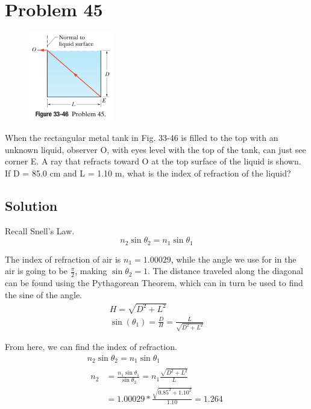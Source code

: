 \documentclass[12pt]{article}
\begin{document}
    \section{Problem 45}
        \begin{figure}
            \vspace{-30pt}
            \includegraphics[width=0.33\textwidth]{33-46.png} 
        \end{figure}
        When the rectangular metal tank in Fig. 33-46 is filled to the top with an unknown liquid, observer O, with eyes level with the top of the tank, can just see corner E. 
        A ray that refracts toward O at the top surface of the liquid is shown. 
        If D = 85.0 cm and L = 1.10 m, what is the index of refraction of the liquid?

        \subsection{Solution}
            Recall Snell's Law.
            \begin{equation}
                n_2 \sin \theta_2 = n_1 \sin \theta_1
            \end{equation}

            The index of refraction of air is $n_1 = 1.00029$, while the angle we use for in the air is going to be $\frac{\pi}{2}$, making $\sin \theta_2 = 1$.
            The distance traveled along the diagonal can be found using the Pythagorean Theorem, which can in turn be used to find the sine of the angle.
            \begin{gather}
                H = \sqrt{D^2 + L^2}\\
                \sin(\theta_1) = \frac{D}{H} = \frac{L}{\sqrt{D^2 + L^2}}
            \end{gather}

            From here, we can find the index of refraction.
            \begin{gather}
                n_2 \sin \theta_2 = n_1 \sin \theta_1\\
                \begin{align}
                    n_2 &=  \frac{n_1 \sin \theta_1}{\sin \theta_2}
                        =   n_1 \frac{\sqrt{D^2 + L^2}}{L}\\
                        &=  1.00029 * \frac{\sqrt{0.85^2 + 1.10^2}}{1.10}
                        =   \boxed{1.264}
                \end{align}
            \end{gather}
\end{document}
